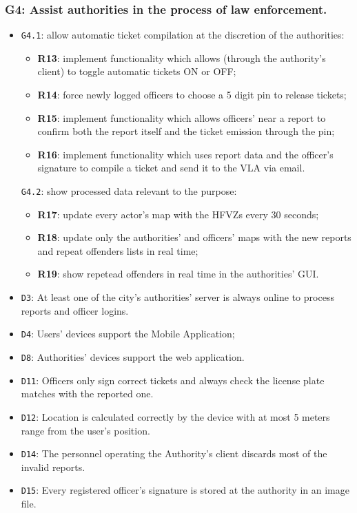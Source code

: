 \documentclass[12pt,a4paper]{article}
\begin{document}
\subsubsection{G4:  Assist authorities in the process of law enforcement.}
	
	\begin{itemize}
	\item \texttt{G4.1}: allow automatic ticket compilation at the discretion of the authorities:
							\begin{itemize}
									\item \textbf{R13}: implement functionality which allows (through the authority's client) to toggle automatic tickets ON or OFF;
									\item \textbf{R14}: force newly logged officers to choose a 5 digit pin to release tickets;
									\item \textbf{R15}: implement functionality which allows officers' near a report to confirm both the report itself and the ticket emission through the pin;
									\item \textbf{R16}: implement functionality which uses report data and the officer's signature to compile a ticket and send it to the VLA via email.
							\end{itemize}
	\texttt{G4.2}: show processed data relevant to the purpose:
							\begin{itemize}
									\item \textbf{R17}: update every actor's map with the HFVZs every 30 seconds;
									\item \textbf{R18}: update only the authorities' and officers' maps with the new reports and repeat offenders lists in real time;
									\item \textbf{R19}: show repetead offenders in real time in the authorities' GUI.
							\end{itemize}
	\end{itemize}
	
	\begin{itemize}
			\item \texttt{D3}: At least one of the city's authorities' server is always online to process reports and officer logins.
			\item \texttt{D4}: Users' devices support the Mobile Application;
			\item \texttt{D8}: Authorities' devices support the web application.
			\item \texttt{D11}: Officers only sign correct tickets and always check the license plate matches with the reported one.
			\item \texttt{D12}: Location is calculated correctly by the device with at most 5 meters range from the user's position.
			\item \texttt{D14}: The personnel operating the Authority's client discards most of the invalid reports.
			\item \texttt{D15}: Every registered officer's signature is stored at the authority in an image file.
	\end{itemize}
\end{document}
